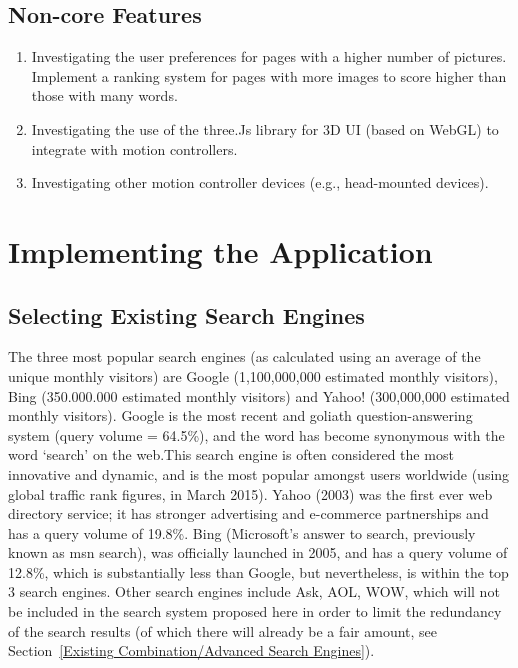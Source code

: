 \documentclass[10pt]{article}
\begin{document}
\subsection{Non-core Features}
\begin{enumerate}

\item Investigating the user preferences for pages with a higher number of pictures. Implement a ranking system for pages with more images to score higher than those with many words. 
\item Investigating the use of the three.Js library for 3D UI (based on WebGL) to integrate with motion controllers.
\item Investigating other motion controller devices (e.g., head-mounted devices).

\end{enumerate}

\section{Implementing the Application}\label{api}
\subsection{Selecting Existing Search Engines} 
The three most popular search engines (as calculated using an average of the unique monthly visitors) are Google (1,100,000,000 estimated monthly visitors), Bing (350.000.000 estimated monthly visitors) and Yahoo! (300,000,000 estimated monthly visitors)\cite{ebiz}. Google is the most recent and goliath question-answering system (query volume = 64.5\%)\cite{adam}, and the word has become synonymous with the word ‘search’ on the web.This search engine is often considered the most innovative and dynamic, and is the most popular amongst users worldwide (using global traffic rank figures, in March 2015). Yahoo (2003) was the first ever web directory service; it has stronger advertising and e-commerce partnerships and has a query volume of 19.8\%. Bing (Microsoft's answer to search, previously known as msn search), was officially launched in 2005, and has a query volume of 12.8\%, which is substantially less than Google, but nevertheless, is within the top 3 search engines. Other search engines include Ask, AOL, WOW, which will not be included in the search system proposed here in order to limit the redundancy of the search results (of which there will already be a fair amount, see Section~\ref{Existing Combination/Advanced Search Engines}). 
\end{document}
